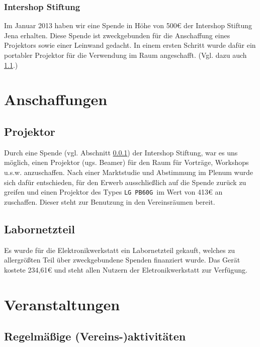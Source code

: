 \documentclass[10pt,DIV16]{scrartcl}
\begin{document}
\subsubsection{Intershop Stiftung}
\label{sec:iss-spende}
Im Januar 2013 haben wir eine Spende in Höhe von 500\euro{} der Intershop
Stiftung Jena erhalten. Diese Spende ist zweckgebunden für die
Anschaffung eines Projektors sowie einer Leinwand gedacht. In einem
ersten Schritt wurde dafür ein portabler Projektor für die Verwendung
im Raum angeschafft. (Vgl. dazu auch \ref{sec:beamerkauf}.)


\section{Anschaffungen}
\label{sec:anschaffungen}


\subsection{Projektor}
\label{sec:beamerkauf}

Durch eine Spende (vgl. Abschnitt \ref{sec:iss-spende}) der
Intershop Stiftung, war es uns möglich, einen Projektor (ugs. Beamer) für den Raum
für Vorträge, Workshops u.s.w. anzuschaffen. Nach einer Marktstudie
und Abstimmung im Plenum wurde sich dafür entschieden, für den
Erwerb ausschließlich auf die Spende zurück zu greifen und einen
Projektor des Types \texttt{LG PB60G }im Wert von 413\euro{} an
zuschaffen. Dieser steht zur Benutzung in den Vereinsräumen bereit.

\subsection{Labornetzteil}
\label{sec:labornetzteil}

Es wurde für die Elektronikwerkstatt ein Labornetzteil gekauft, welches 
zu allergrößten Teil über zweckgebundene Spenden finanziert wurde. Das 
Gerät kostete 234,61\euro{} und steht allen Nutzern der 
Eletronikwerkstatt zur Verfügung.

\section{Veranstaltungen}

\subsection{Regelmäßige (Vereins-)aktivitäten}
\end{document}

